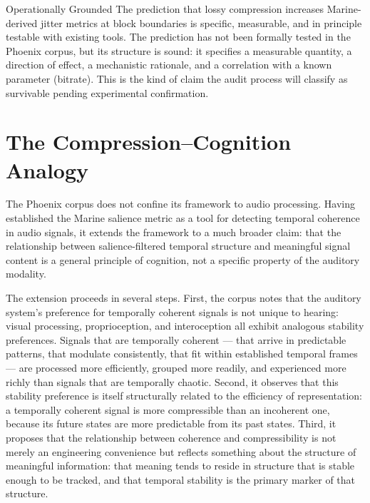 \begin{epistemicstatus}{Operationally Grounded}
The prediction that lossy compression increases Marine-derived jitter
metrics at block boundaries is specific, measurable, and in principle
testable with existing tools. The prediction has not been formally
tested in the Phoenix corpus, but its structure is sound: it specifies
a measurable quantity, a direction of effect, a mechanistic rationale,
and a correlation with a known parameter (bitrate). This is the kind
of claim the \Ortyx{} audit process will classify as survivable pending
experimental confirmation.
\end{epistemicstatus}

\section{The Compression--Cognition Analogy}
\label{sec:compression-cognition}

The Phoenix corpus does not confine its framework to audio processing.
Having established the Marine salience metric as a tool for detecting
temporal coherence in audio signals, it extends the framework to a
much broader claim: that the relationship between salience-filtered
temporal structure and meaningful signal content is a general
principle of cognition, not a specific property of the auditory
modality.

The extension proceeds in several steps. First, the corpus notes
that the auditory system's preference for temporally coherent signals
is not unique to hearing: visual processing, proprioception, and
interoception all exhibit analogous stability preferences. Signals
that are temporally coherent --- that arrive in predictable patterns,
that modulate consistently, that fit within established temporal
frames --- are processed more efficiently, grouped more readily, and
experienced more richly than signals that are temporally chaotic.
Second, it observes that this stability preference is itself
structurally related to the efficiency of representation: a temporally
coherent signal is more compressible than an incoherent one, because
its future states are more predictable from its past states. Third,
it proposes that the relationship between coherence and
compressibility is not merely an engineering convenience but reflects
something about the structure of meaningful information: that meaning
tends to reside in structure that is stable enough to be tracked,
and that temporal stability is the primary marker of that structure.

